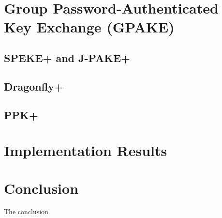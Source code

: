 \documentclass{amsart}
\theoremstyle{remark}
\begin{document}

\section{Group Password-Authenticated Key Exchange (GPAKE)} 
\label{sec:GPAKE}


\subsection{SPEKE+ and J-PAKE+}


\subsection{Dragonfly+}


\subsection{PPK+}



\section{Implementation Results}
\label{sec:Implementation}



\section{Conclusion}
\label{sec:Conclusion}
The conclusion




\nocite{*}


\end{document}
